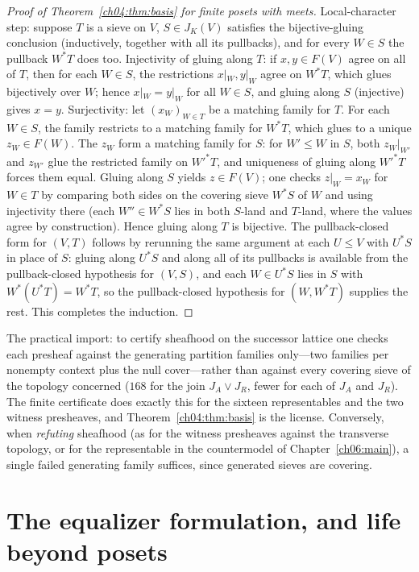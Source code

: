 \begin{proof}[Proof of Theorem~\ref{ch04:thm:basis} for finite posets with meets]
Local-character step: suppose $T$ is a sieve on $V$, $S\in J_K(V)$ satisfies
the bijective-gluing conclusion (inductively, together with all its
pullbacks), and for every $W\in S$ the pullback $W^{*}T$ does too. Injectivity
of gluing along $T$: if $x,y\in F(V)$ agree on all of $T$, then for each
$W\in S$, the restrictions $x|_W,y|_W$ agree on $W^{*}T$, which glues
bijectively over $W$; hence $x|_W=y|_W$ for all $W\in S$, and gluing along
$S$ (injective) gives $x=y$. Surjectivity: let $(x_W)_{W\in T}$ be a matching
family for $T$. For each $W\in S$, the family restricts to a matching family
for $W^{*}T$, which glues to a unique $z_W\in F(W)$. The $z_W$ form a matching
family for $S$: for $W'\le W$ in $S$, both $z_W|_{W'}$ and $z_{W'}$ glue the
restricted family on $W'^{*}T$, and uniqueness of gluing along $W'^{*}T$
forces them equal. Gluing along $S$ yields $z\in F(V)$; one checks
$z|_{W}=x_{W}$ for $W\in T$ by comparing both sides on the covering sieve
$W^{*}S$ of $W$ and using injectivity there (each $W''\in W^{*}S$ lies in both
$S$-land and $T$-land, where the values agree by construction). Hence gluing
along $T$ is bijective. The pullback-closed form for $(V,T)$ follows by
rerunning the same argument at each $U\le V$ with $U^{*}S$ in place of $S$:
gluing along $U^{*}S$ and along all of its pullbacks is available from the
pullback-closed hypothesis for $(V,S)$, and each $W\in U^{*}S$ lies in $S$
with $W^{*}(U^{*}T)=W^{*}T$, so the pullback-closed hypothesis for
$(W,W^{*}T)$ supplies the rest. This completes the induction.
\end{proof}

\begin{remark}\label{ch04:rem:basispractice}
The practical import: to certify sheafhood on the successor lattice one checks
each presheaf against the generating partition families only---two families
per nonempty context plus the null cover---rather than against every covering
sieve of the topology concerned ($168$ for the join $J_A\vee J_R$, fewer for
each of $J_A$ and $J_R$). The finite certificate does exactly
this for the sixteen representables and the two witness presheaves, and
Theorem~\ref{ch04:thm:basis} is the license. Conversely, when
\emph{refuting} sheafhood (as for the witness presheaves against the
transverse topology, or for the representable in the countermodel of
Chapter~\ref{ch06:main}), a single failed generating family suffices, since
generated sieves are covering.
\end{remark}

\section{The equalizer formulation, and life beyond posets}\label{ch04:sec:equalizer}

